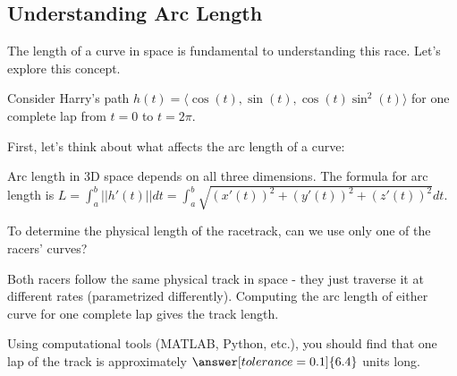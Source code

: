 \documentclass{ximera}
\begin{document}
\subsection*{Understanding Arc Length}

The length of a curve in space is fundamental to understanding this race. Let's explore this concept.

\begin{problem}
    Consider Harry's path $h(t)=\langle \cos(t), \sin(t), \cos(t)\sin^2(t)\rangle$ for one complete lap from $t=0$ to $t=2\pi$.
    
    First, let's think about what affects the arc length of a curve:
    \begin{multipleChoice}
    \end{multipleChoice}
    
    \begin{feedback}
        Arc length in 3D space depends on all three dimensions. The formula for arc length is $L=\int_a^b ||h'(t)||dt=\int_a^b\sqrt{(x'(t))^2+(y'(t))^2+(z'(t))^2}dt$.
    \end{feedback}
\end{problem}

\begin{problem}
    To determine the physical length of the racetrack, can we use only one of the racers' curves?
    \begin{multipleChoice}
    \end{multipleChoice}
    
    \begin{feedback}
        Both racers follow the same physical track in space - they just traverse it at different rates (parametrized differently). Computing the arc length of either curve for one complete lap gives the track length.
        
        Using computational tools (MATLAB, Python, etc.), you should find that one lap of the track is approximately $\answer[tolerance=0.1]{6.4}$ units long.
    \end{feedback}
\end{problem}
\end{document}
